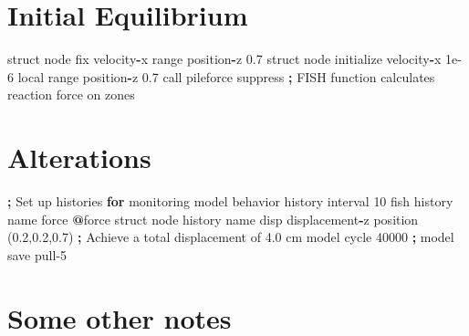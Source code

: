 \documentclass[a4paper, nobind]{templates/ociamthesis}
\newenvironment{Shaded}{\begin{snugshade}}{\end{snugshade}}
\newcommand{\BuiltInTok}[1]{#1}
\newcommand{\ControlFlowTok}[1]{\textcolor[rgb]{0.13,0.29,0.53}{\textbf{#1}}}
\newcommand{\DecValTok}[1]{\textcolor[rgb]{0.00,0.00,0.81}{#1}}
\newcommand{\FloatTok}[1]{\textcolor[rgb]{0.00,0.00,0.81}{#1}}
\newcommand{\NormalTok}[1]{#1}
\newcommand{\OperatorTok}[1]{\textcolor[rgb]{0.81,0.36,0.00}{\textbf{#1}}}
\newcommand{\StringTok}[1]{\textcolor[rgb]{0.31,0.60,0.02}{#1}}
\renewenvironment{Shaded}
{
  \vspace{10pt}%
  \begin{snugshade}%
}{%
  \end{snugshade}%
  \vspace{8pt}%
}
\begin{document}
\hypertarget{initial-equilibrium-2}{%
\section{Initial Equilibrium}\label{initial-equilibrium-2}}

\begin{Shaded}
\begin{Highlighting}[]
\NormalTok{struct node fix velocity}\OperatorTok{{-}}\NormalTok{x }\BuiltInTok{range}\NormalTok{ position}\OperatorTok{{-}}\NormalTok{z }\FloatTok{0.7}
\NormalTok{struct node initialize velocity}\OperatorTok{{-}}\NormalTok{x }\FloatTok{1e{-}6}\NormalTok{ local }\BuiltInTok{range}\NormalTok{ position}\OperatorTok{{-}}\NormalTok{z }\FloatTok{0.7}
\NormalTok{call }\StringTok{\textquotesingle{}pileforce\textquotesingle{}}\NormalTok{ suppress }\OperatorTok{;}\NormalTok{ FISH function calculates reaction force on zones}
\end{Highlighting}
\end{Shaded}

\hypertarget{alterations-2}{%
\section{Alterations}\label{alterations-2}}

\begin{Shaded}
\begin{Highlighting}[]
\OperatorTok{;}\NormalTok{ Set up histories }\ControlFlowTok{for}\NormalTok{ monitoring model behavior}
\NormalTok{history interval }\DecValTok{10}
\NormalTok{fish history name }\StringTok{\textquotesingle{}force\textquotesingle{}} \OperatorTok{@}\NormalTok{force}
\NormalTok{struct node history name }\StringTok{\textquotesingle{}disp\textquotesingle{}}\NormalTok{ displacement}\OperatorTok{{-}}\NormalTok{z position (}\FloatTok{0.2}\NormalTok{,}\FloatTok{0.2}\NormalTok{,}\FloatTok{0.7}\NormalTok{)}
\OperatorTok{;}\NormalTok{ Achieve a total displacement of }\FloatTok{4.0}\NormalTok{ cm}
\NormalTok{model cycle }\DecValTok{40000}
\OperatorTok{;}
\NormalTok{model save }\StringTok{\textquotesingle{}pull{-}5\textquotesingle{}}
\end{Highlighting}
\end{Shaded}

\hypertarget{some-other-notes}{%
\section{Some other notes}\label{some-other-notes}}
\end{document}
